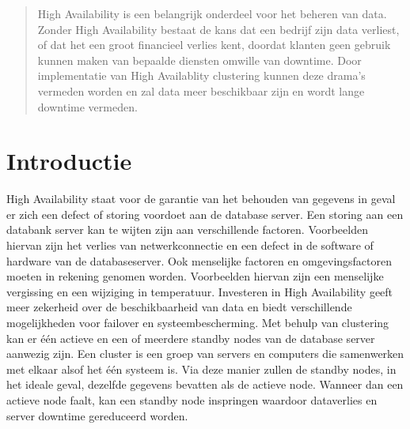 \documentclass[a0,portrait]{a0poster}
\begin{document}
\begin{multicols}{2} %


\color{HoGentAccent1} %

\begin{abstract}
High Availability is een belangrijk onderdeel voor het beheren van data. Zonder High Availability bestaat de kans dat een bedrijf zijn data verliest, of dat het een groot financieel verlies kent, doordat klanten geen gebruik kunnen maken van bepaalde diensten omwille van downtime. Door implementatie van High Availablity clustering kunnen deze drama's vermeden worden en zal data meer beschikbaar zijn en wordt lange downtime vermeden.
\end{abstract}

\color{HoGentAccent1} 
\section*{Introductie}
\color{black}
\color{black}
High Availability staat voor de garantie van het behouden van gegevens in geval er zich een defect of storing voordoet aan de database server. Een storing aan een databank server kan te wijten zijn aan verschillende factoren. Voorbeelden hiervan zijn het verlies van netwerkconnectie en een defect in de software of hardware van de databaseserver. Ook menselijke factoren en omgevingsfactoren moeten in rekening genomen worden. Voorbeelden hiervan zijn een menselijke vergissing en een wijziging in temperatuur. Investeren in High Availability geeft meer zekerheid over de beschikbaarheid van data en biedt verschillende mogelijkheden voor failover en systeembescherming. 
Met behulp van clustering kan er één actieve en een of meerdere standby nodes van de database server aanwezig zijn. Een cluster is een groep van servers en computers die samenwerken met elkaar alsof het één systeem is. Via deze manier zullen de standby nodes, in het ideale geval, dezelfde gegevens bevatten als de actieve node. Wanneer dan een actieve node faalt, kan een standby node inspringen waardoor dataverlies en server downtime gereduceerd worden.



\end{multicols}
\end{document}
